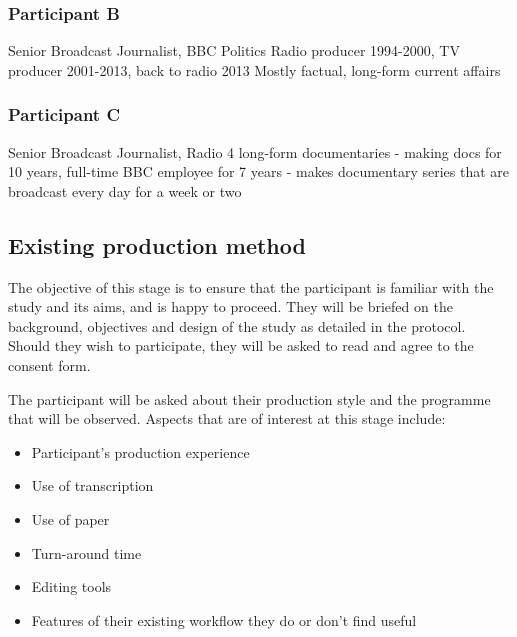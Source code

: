 \subsubsection{Participant B}
Senior Broadcast Journalist, BBC Politics
Radio producer 1994-2000, TV producer 2001-2013, back to radio 2013
Mostly factual, long-form current affairs 

\subsubsection{Participant C}
Senior Broadcast Journalist, Radio 4 long-form documentaries
- making docs for 10 years, full-time BBC employee for 7 years
- makes documentary series that are broadcast every day for a week or two

\subsection{Existing production method}
The objective of this stage is to ensure that the participant is familiar with
the study and its aims, and is happy to proceed. They will be briefed on the
background, objectives and design of the study as detailed in the protocol.
Should they wish to participate, they will be asked to read and agree to the
consent form.

The participant will be asked about their production style and the programme
that will be observed. Aspects that are of interest at this stage include:
\begin{itemize}
\setlength\itemsep{0em}
\item Participant's production experience
\item Use of transcription
\item Use of paper
\item Turn-around time
\item Editing tools
\item Features of their existing workflow they do or don't find useful
\end{itemize}

